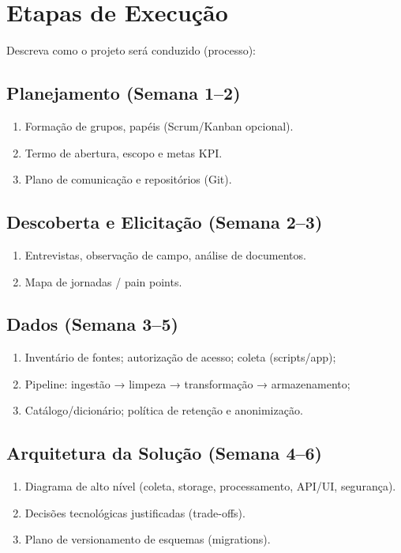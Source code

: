 \chapter{Etapas de Execução}
\label{cap:etapas}

Descreva como o projeto será conduzido (processo):

\section{Planejamento (Semana 1–2)}
\begin{enumerate}
    \item Formação de grupos, papéis (Scrum/Kanban opcional).
    \item Termo de abertura, escopo e metas KPI.
    \item Plano de comunicação e repositórios (Git).
\end{enumerate}

\section{Descoberta e Elicitação (Semana 2–3)}
\begin{enumerate}
    \item Entrevistas, observação de campo, análise de documentos.
    \item Mapa de jornadas / pain points.
\end{enumerate}

\section{Dados (Semana 3–5)}
\begin{enumerate}
    \item Inventário de fontes; autorização de acesso; coleta (scripts/app);
    \item Pipeline: ingestão → limpeza → transformação → armazenamento;
    \item Catálogo/dicionário; política de retenção e anonimização.
\end{enumerate}

\section{Arquitetura da Solução (Semana 4–6)}
\begin{enumerate}
    \item Diagrama de alto nível (coleta, storage, processamento, API/UI, segurança).
    \item Decisões tecnológicas justificadas (trade-offs).
    \item Plano de versionamento de esquemas (migrations).
\end{enumerate}

